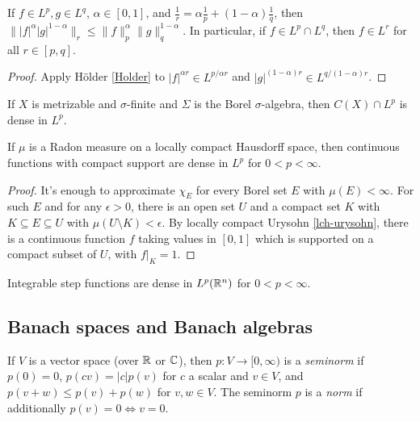 \begin{prop} If $f \in L^p, g \in L^q$, $\alpha \in [0,1]$, and $\frac{1}{r} = \alpha \frac{1}{p} + (1-\alpha) \frac{1}{q}$, then $\||f|^{\alpha}|g|^{1-\alpha}\|_r \le \|f\|_p^{\alpha}\|g\|_q^{1-\alpha}$. In particular, if $f \in L^p\cap L^q$, then $f \in L^r$ for all $r \in [p,q]$.
\end{prop}
\begin{proof} Apply H\"older \ref{Holder} to $|f|^{\alpha r} \in L^{p/\alpha r}$ and $|g|^{(1-\alpha)r} \in L^{q/(1-\alpha)r}$.
\end{proof}

\begin{prop} If $X$ is metrizable and $\sigma$-finite and $\Sigma$ is the Borel $\sigma$-algebra, then $C(X) \cap L^p$ is dense in $L^p$.
\end{prop}

\begin{prop} If $\mu$ is a Radon measure on a locally compact Hausdorff space, then continuous functions with compact support are dense in $L^p$ for $0 < p < \infty$.
\end{prop}
\begin{proof} It's enough to approximate $\chi_E$ for every Borel set $E$ with $\mu(E) < \infty$. For such $E$ and for any $\epsilon > 0$, there is an open set $U$ and a compact set $K$ with $K \subseteq E \subseteq U$ with $\mu(U\setminus K) < \epsilon$. By locally compact Urysohn \ref{lch-urysohn}, there is a continuous function $f$ taking values in $[0,1]$ which is supported on a compact subset of $U$, with $f|_K = 1$.
\end{proof}

\begin{cor} Integrable step functions are dense in $L^p(\mathbb{R}^n)$ for $0 < p < \infty$.
\end{cor}


\subsection{Banach spaces and Banach algebras}

\begin{defn} If $V$ is a vector space (over $\mathbb{R}$ or $\mathbb{C}$), then $p:V \rightarrow [0,\infty)$ is a \emph{seminorm} if $p(0) = 0$, $p(cv) = |c|p(v)$ for $c$ a scalar and $v\in V$, and $p(v+w) \le p(v) + p(w)$ for $v,w \in V$. The seminorm $p$ is a \emph{norm} if additionally $p(v) = 0 \iff v = 0$.
\end{defn}

